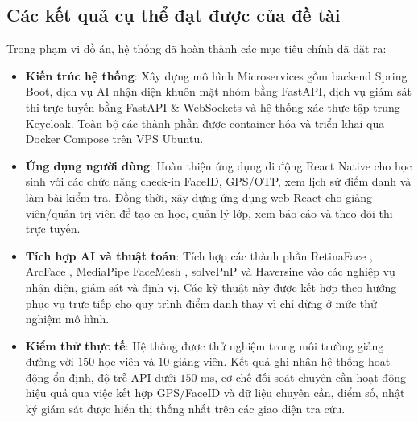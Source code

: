 \documentclass[../DoAn.tex]{subfiles}
\begin{document}
\subsection{Các kết quả cụ thể đạt được của đề tài}
Trong phạm vi đồ án, hệ thống đã hoàn thành các mục tiêu chính đã đặt ra:
\begin{itemize}
    \item \textbf{Kiến trúc hệ thống}: Xây dựng mô hình Microservices gồm backend Spring Boot, dịch vụ AI nhận diện khuôn mặt nhóm bằng FastAPI, dịch vụ giám sát thi trực tuyến bằng FastAPI \& WebSockets và hệ thống xác thực tập trung Keycloak. Toàn bộ các thành phần được container hóa và triển khai qua Docker Compose trên VPS Ubuntu.
    \item \textbf{Ứng dụng người dùng}: Hoàn thiện ứng dụng di động React Native cho học sinh với các chức năng check-in FaceID, GPS/OTP, xem lịch sử điểm danh và làm bài kiểm tra. Đồng thời, xây dựng ứng dụng web React cho giảng viên/quản trị viên để tạo ca học, quản lý lớp, xem báo cáo và theo dõi thi trực tuyến.
    \item \textbf{Tích hợp AI và thuật toán}: Tích hợp các thành phần RetinaFace \cite{Deng_2020_CVPR}, ArcFace \cite{Deng_2019_CVPR}, MediaPipe FaceMesh \cite{Lugaresi2019MediaPipe}, solvePnP và Haversine vào các nghiệp vụ nhận diện, giám sát và định vị. Các kỹ thuật này được kết hợp theo hướng phục vụ trực tiếp cho quy trình điểm danh thay vì chỉ dừng ở mức thử nghiệm mô hình.
    \item \textbf{Kiểm thử thực tế}: Hệ thống được thử nghiệm trong môi trường giảng đường với $150$ học viên và $10$ giảng viên. Kết quả ghi nhận hệ thống hoạt động ổn định, độ trễ API dưới $150$ ms, cơ chế đối soát chuyên cần hoạt động hiệu quả qua việc kết hợp GPS/FaceID và dữ liệu chuyên cần, điểm số, nhật ký giám sát được hiển thị thống nhất trên các giao diện tra cứu.
\end{itemize}
\end{document}

